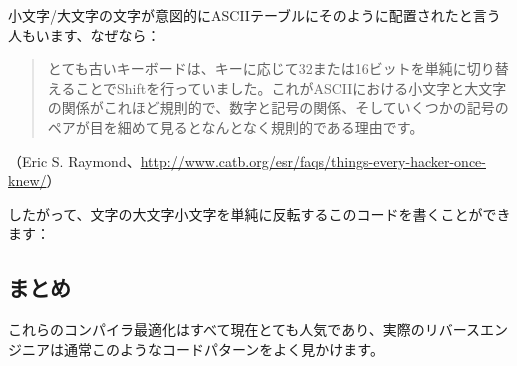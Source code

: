 小文字/大文字の文字が意図的に\ac{ASCII}テーブルにそのように配置されたと言う人もいます、なぜなら：

\begin{framed}
\begin{quotation}
とても古いキーボードは、キーに応じて32または16ビットを単純に切り替えることでShiftを行っていました。これがASCIIにおける小文字と大文字の関係がこれほど規則的で、数字と記号の関係、そしていくつかの記号のペアが目を細めて見るとなんとなく規則的である理由です。
\end{quotation}
\end{framed}

（Eric S. Raymond、\url{http://www.catb.org/esr/faqs/things-every-hacker-once-knew/}）

したがって、文字の大文字小文字を単純に反転するこのコードを書くことができます：



\subsection{まとめ}

これらのコンパイラ最適化はすべて現在とても人気であり、実際のリバースエンジニアは通常このようなコードパターンをよく見かけます。